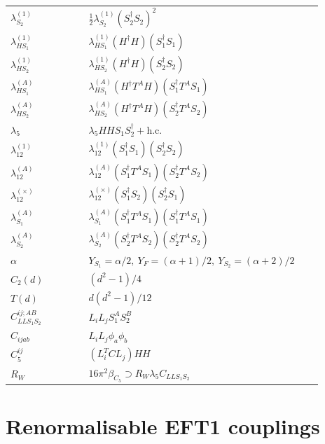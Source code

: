 \documentclass[8pt]{article}
\begin{document}
\begin{landscape}
\begin{longtable}{@{}p{0.23\linewidth}p{0.69\linewidth}@{}}
$\lambda_{S_2}^{(1)}$ & $\frac12\lambda_{S_2}^{(1)}(S_2^\dagger S_2)^2$ \\
$\lambda_{HS_1}^{(1)}$ & $\lambda_{HS_1}^{(1)}(H^\dagger H)(S_1^\dagger S_1)$ \\
$\lambda_{HS_2}^{(1)}$ & $\lambda_{HS_2}^{(1)}(H^\dagger H)(S_2^\dagger S_2)$ \\
$\lambda_{HS_1}^{(A)}$ & $\lambda_{HS_1}^{(A)}(H^\dagger T^AH)(S_1^\dagger T^AS_1)$ \\
$\lambda_{HS_2}^{(A)}$ & $\lambda_{HS_2}^{(A)}(H^\dagger T^AH)(S_2^\dagger T^AS_2)$ \\
$\lambda_5$ & $\lambda_5HHS_1S_2^\dagger+\mathrm{h.c.}$ \\
$\lambda_{12}^{(1)}$ & $\lambda_{12}^{(1)}(S_1^\dagger S_1)(S_2^\dagger S_2)$ \\
$\lambda_{12}^{(A)}$ & $\lambda_{12}^{(A)}(S_1^\dagger T^AS_1)(S_2^\dagger T^AS_2)$ \\
$\lambda_{12}^{(\times)}$ & $\lambda_{12}^{(\times)}(S_1^\dagger S_2)(S_2^\dagger S_1)$ \\
$\lambda_{S_1}^{(A)}$ & $\lambda_{S_1}^{(A)}(S_1^\dagger T^A S_1)(S_1^\dagger T^A S_1)$ \\
$\lambda_{S_2}^{(A)}$ & $\lambda_{S_2}^{(A)}(S_2^\dagger T^A S_2)(S_2^\dagger T^A S_2)$ \\
$\alpha$ & $Y_{S_1}=\alpha/2,\ Y_F=(\alpha+1)/2,\ Y_{S_2}=(\alpha+2)/2$ \\
$C_2(d)$ & $(d^2-1)/4$ \\
$T(d)$ & $d(d^2-1)/12$ \\
$C_{LLS_1S_2}^{ij;AB}$ & $L_iL_jS_1^AS_2^B$ \\
$C_{ijab}$ & $L_iL_j\phi_a\phi_b$ \\
$C_5^{ij}$ & $(L_i^TCL_j)HH$ \\
$R_W$ & $16\pi^2\beta_{C_5}\supset R_W\lambda_5C_{LLS_1S_2}$ \\
\bottomrule
\end{longtable}
\section*{Renormalisable EFT1 couplings}

\end{landscape}
\end{document}
